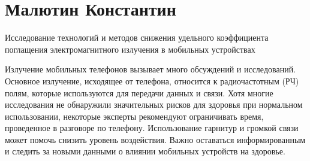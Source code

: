 \documentclass{article}
\begin{document}
\section*{Малютин Константин}
Исследование технологий и методов снижения удельного коэффициента поглащения электромагнитного излучения в мобильных устройствах


Излучение мобильных телефонов вызывает много обсуждений и исследований. Основное излучение, исходящее от телефона, относится к радиочастотным (РЧ) полям, которые используются для передачи данных и связи. Хотя многие исследования не обнаружили значительных рисков для здоровья при нормальном использовании, некоторые эксперты рекомендуют ограничивать время, проведенное в разговоре по телефону. Использование гарнитур и громкой связи может помочь снизить уровень воздействия. Важно оставаться информированным и следить за новыми данными о влиянии мобильных устройств на здоровье.
\end{document}

